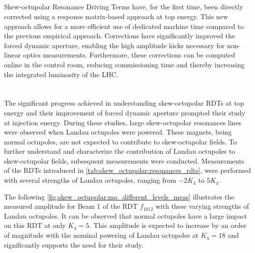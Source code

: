 \subsection{}

Skew-octupolar Resonance Driving Terms have, for the first time, been directly corrected using a
response matrix-based approach at top energy. This new approach allows for a more efficient
use of dedicated machine time compared to the previous empirical approach. Corrections have
significantly improved the forced dynamic aperture, enabling the high amplitude kicks necessary for
non-linear optics measurements.
Furthermore, these corrections can be computed online in the control room, reducing commissioning
time and thereby increasing the integrated luminosity of the LHC.




\FloatBarrier
\section{}



The significant progress achieved in understanding skew-octupolar RDTs at top energy and their improvement of 
forced dynamic aperture prompted their study at injection energy. During these studies,
large skew-octupolar resonances lines were observed when Landau octupoles were powered. These 
magnets, being normal octupoles, are not expected to contribute to skew-octupolar fields.
To further understand and characterize the contribution of Landau octupoles to skew-octupolar
fields, subsequent measurements were conducted. Measurements of the RDTs introduced in
\cref{tab:skew_octupolar:resonances_rdts}, were performed with several strengths of Landau
octupoles, ranging from $-2 K_4$ to $5 K_4$.

The following \cref{fig:skew_octupolar:mo_different_levels_meas} illustrates the measured amplitude
for Beam 1 of the RDT $f_{1012}$ with these varying strengths of Landau octupoles. It can be
observed that normal octupoles have a large impact on this RDT at only $K_4 = 5$. This amplitude is
expected to increase by an order of magnitude with the nominal powering of Landau octupoles at
$K_4 = 18$ and significantly supports the need for their study.

